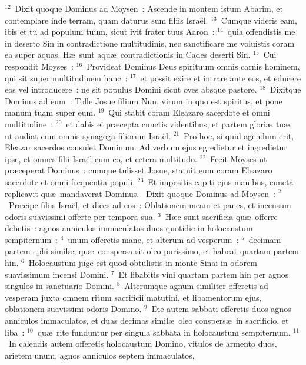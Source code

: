 ${}^{12}$~Dixit quoque Dominus ad Moysen~: Ascende in montem istum Abarim, et contemplare inde terram, quam daturus sum filiis Isra\"el.
${}^{13}$~Cumque videris eam, ibis et tu ad populum tuum, sicut ivit frater tuus Aaron~:
${}^{14}$~quia offendistis me in deserto Sin in contradictione multitudinis, nec sanctificare me voluistis coram ea super aquas. H\ae\ sunt aqu\ae\ contradictionis in Cades deserti Sin.
${}^{15}$~Cui respondit Moyses~:
${}^{16}$~Provideat Dominus Deus spirituum omnis carnis hominem, qui sit super multitudinem hanc~:
${}^{17}$~et possit exire et intrare ante eos, et educere eos vel introducere~: ne sit populus Domini sicut oves absque pastore.
${}^{18}$~Dixitque Dominus ad eum~: Tolle Josue filium Nun, virum in quo est spiritus, et pone manum tuam super eum.
${}^{19}$~Qui stabit coram Eleazaro sacerdote et omni multitudine~:
${}^{20}$~et dabis ei pr\ae cepta cunctis videntibus, et partem glori\ae\ tu\ae , ut audiat eum omnis synagoga filiorum Isra\"el.
${}^{21}$~Pro hoc, si quid agendum erit, Eleazar sacerdos consulet Dominum. Ad verbum ejus egredietur et ingredietur ipse, et omnes filii Isra\"el cum eo, et cetera multitudo.
${}^{22}$~Fecit Moyses ut pr\ae ceperat Dominus~: cumque tulisset Josue, statuit eum coram Eleazaro sacerdote et omni frequentia populi.
${}^{23}$~Et impositis capiti ejus manibus, cuncta replicavit qu\ae\ mandaverat Dominus.
~\lettrine[lines=10,image=true,loversize=0.05,lraise=-0.03]{D}{}ixit quoque Dominus ad Moysen~:
${}^{2}$~Pr\ae cipe filiis Isra\"el, et dices ad eos~: Oblationem meam et panes, et incensum odoris suavissimi offerte per tempora sua.
${}^{3}$~H\ae c sunt sacrificia qu\ae\ offerre debetis~: agnos anniculos immaculatos duos quotidie in holocaustum sempiternum~:
${}^{4}$~unum offeretis mane, et alterum ad vesperum~:
${}^{5}$~decimam partem ephi simil\ae , qu\ae\ conspersa sit oleo purissimo, et habeat quartam partem hin.
${}^{6}$~Holocaustum juge est quod obtulistis in monte Sinai in odorem suavissimum incensi Domini.
${}^{7}$~Et libabitis vini quartam partem hin per agnos singulos in sanctuario Domini.
${}^{8}$~Alterumque agnum similiter offeretis ad vesperam juxta omnem ritum sacrificii matutini, et libamentorum ejus, oblationem suavissimi odoris Domino.
${}^{9}$~Die autem sabbati offeretis duos agnos anniculos immaculatos, et duas decimas simil\ae\ oleo conspers\ae\ in sacrificio, et liba~:
${}^{10}$~qu\ae\ rite funduntur per singula sabbata in holocaustum sempiternum.
${}^{11}$~In calendis autem offeretis holocaustum Domino, vitulos de armento duos, arietem unum, agnos anniculos septem immaculatos,
